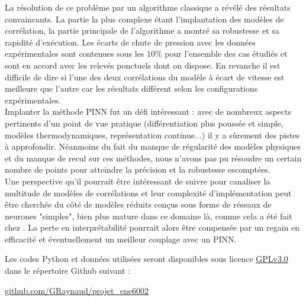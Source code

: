 La résolution de ce problème par un algorithme classique a révélé des résultats convaincants. La partie la plus complexe étant l'implantation des modèles de corrélation, la partie principale de l'algorithme a montré sa robustesse et sa rapidité d'exécution. Les écarts de chute de pression avec les données expérimentales sont contenues sous les 10\% pour l'ensemble des cas étudiés et sont en accord avec les relevés ponctuels dont on dispose. En revanche il est difficile de dire si l'une des deux corrélations du modèle à écart de vitesse est meilleure que l'autre car les résultats différent selon les configurations expérimentales.\\

Implanter la méthode PINN fut un défi intéressant : avec de nombreux aspects pertinents d'un point de vue pratique (différentiation plus poussée et simple, modèles thermodynamiques, représentation continue...) il y a sûrement des pistes à approfondir. Néanmoins du fait du manque de régularité des modèles physiques et du manque de recul sur ces méthodes, nous n'avons pas pu résoudre un certain nombre de points pour atteindre la précision et la robustesse escomptées.\\

Une perspective qu'il pourrait être intéressant de suivre pour canaliser la multitude de modèles de corrélations et leur complexité d'implémentation peut être cherchée du côté de modèles réduits conçus sous forme de réseaux de neurones "simples", bien plus mature dans ce domaine là, comme cela a été fait chez \cite{alvarezdelcastilloNewVoidFraction2012}. La perte en interprétabilité pourrait alors être compensée par un regain en efficacité et éventuellement un meilleur couplage avec un PINN.\\

\medskip

Les codes Python et données utilisées seront disponibles sous licence \href{https://choosealicense.com/licenses/gpl-3.0/}{GPLv3.0} dans le répertoire Github suivant :
\begin{center}
    \href{https://github.com/GRaynaud/projet_ene6002}{github.com/GRaynaud/projet\_ene6002}
\end{center}